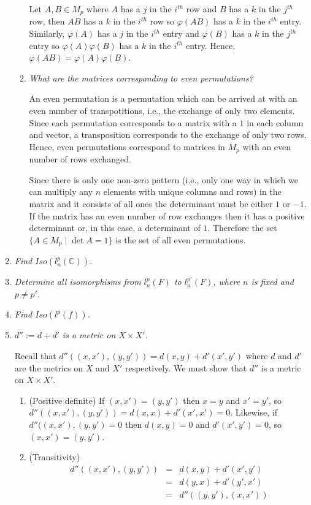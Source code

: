 \documentclass[11pt]{article}
\begin{document}
\begin{enumerate}
\begin{enumerate}
Let $A,B \in M_p$ where $A$ has a $j$ in the $i^{th}$ row and $B$ has a $k$ in the $j^{th}$ row, then $AB$ has a $k$ in the $i^{th}$ row so $\varphi(AB)$ has a $k$ in the $i^{th}$ entry.  Similarly, $\varphi(A)$ has a $j$ in the $i^{th}$ entry and $\varphi(B)$ has a $k$ in the $j^{th}$ entry so $\varphi(A)\varphi(B)$ has a $k$ in the $i^{th}$ entry.  Hence, $\varphi(AB) = \varphi(A)\varphi(B)$.

\item \emph{What are the matrices corresponding to even permutations?}

An even permutation is a permutation which can be arrived at with an even number of transpotitions, i.e., the exchange of only two elements.  Since each permutation corresponds to a matrix with a $1$ in each column and vector, a transposition corresponds to the exchange of only two rows.  Hence, even permutations correspond to matrices in $M_p$ with an even number of rows exchanged.

Since there is only one non-zero pattern (i.e., only one way in which we can multiply any $n$ elements with unique columns and rows) in the matrix and it consists of all ones the determinant must be either $1$ or $-1$. If the matrix has an even number of row exchanges then it has a positive determinant or, in this case, a determinant of $1$.  Therefore the set $\{A \in M_p \mid \det A = 1\}$ is the set of all even permutations.
\end{enumerate}

\item \emph{Find $Iso(l^p_n(\mathbb{C}))$.}
\item \emph{Determine all isomorphisms from $l^p_n(F)$ to $l^{p'}_n(F)$, where $n$ is fixed and $p \neq p'$.}
\item \emph{Find $Iso(l^p(f))$.}

\item \emph{$d'' := d + d'$ is a metric on $X \times X'$.}

Recall that $d''((x,x'), (y,y')) = d(x,y) + d'(x',y')$ where $d$ and $d'$ are the metrics on $X$ and $X'$ respectively.  We must show that $d''$ is a metric on $X \times X'$.

\begin{enumerate}
\item{(Positive definite)} 
If $(x,x') = (y,y')$ then  $x=y$ and $x'=y'$, so $d''((x,x'), (y,y')) = d(x,x) + d'(x',x') = 0$.  Likewise, if $d''((x,x'), (y,y') = 0$ then $d(x,y) = 0$ and $d'(x',y') = 0$, so $(x,x') = (y,y')$.
\item{(Transitivity)} 
\begin{eqnarray*}
d''((x,x'), (y,y')) &=& d(x,y) + d'(x',y') \\
&=& d(y,x) + d'(y',x') \\
&=& d''((y,y'), (x,x'))
\end{eqnarray*}


\end{enumerate}
\end{enumerate}
\end{document}
